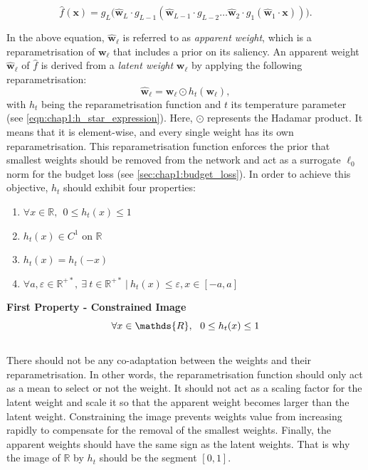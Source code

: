 \begin{equation}
\label{eqn:chap1:layer_eq_f_hat}
\hat{f}(\mathbf{x}) = g_L \big(\mathbf{\hat w}_L \cdot g_{L-1}(\mathbf{\hat w}_{L-1} \cdot g_{L-2}
\dots\mathbf{\hat w}_2 \cdot g_1(\mathbf{\hat w}_1 \cdot \mathbf{x}))\big).
\end{equation}

\noindent In the above equation, $\mathbf{\hat w}_\ell$ is referred to as
\textit{apparent weight}, which is a reparametrisation of $\mathbf{w}_\ell$ that
includes a prior on its saliency. An apparent weight $\mathbf{\hat w}_\ell$ of
$\hat{f}$ is derived from a \emph{latent weight} $\mathbf{w}_\ell$ by applying the
following reparametrisation: 
\begin{equation}
  \label{eqn:reparam}
  \mathbf{\hat w}_\ell = \mathbf{w}_\ell  \odot h_t(\mathbf{w}_\ell),
\end{equation}
\noindent with $h_t$ being the reparametrisation function and $t$ its
temperature parameter (see \cref{eqn:chap1:h_star_expression}). Here, $\odot$
represents the Hadamar product. It means that it is element-wise, and every
single weight has its own reparametrisation. This reparametrisation function
enforces the prior that smallest weights should be removed from the network and
act as a surrogate $\ell_0$ norm for the budget loss (see
\cref{sec:chap1:budget_loss}). In order to achieve this objective, $h_t$ should
exhibit four properties: \\

\begin{enumerate}
  \item $\forall x \in \mathds{R},~~ 0 \leq h_t(x) \leq 1 $
  \item $h_t(x) \in C^1 \text{ on } \mathds{R}$
  \item $h_t(x) = h_t(-x)$
  \item $\forall a,\varepsilon \in\mathds{R}^{+\ast},~ \exists ~t
  \in\mathds{R}^{+\ast} ~ | ~ h_t(x) \leq \varepsilon, x \in [-a,a]$
\end{enumerate}

\noindent\textbf{First Property - Constrained Image} \\
\begin{equation}
    \centering
    \forall x \in \mathds{R},~~ 0 \leq h_t(x) \leq 1
    \label{eqn:chap1:reparam_prop1}
\end{equation}
\\
There should not be any co-adaptation between the weights and their
reparametrisation. In other words, the reparametrisation function should only act
as a mean to select or not the weight. It should not act as a scaling factor for
the latent weight and scale it so that the apparent weight becomes larger than
the latent weight. Constraining the image prevents weights value from increasing
rapidly to compensate for the removal of the smallest weights. Finally, the
apparent weights should have the same sign as the latent weights. That is why the
image of $\mathbb{R}$ by $h_t$ should be the segment $[0,1]$.\\

